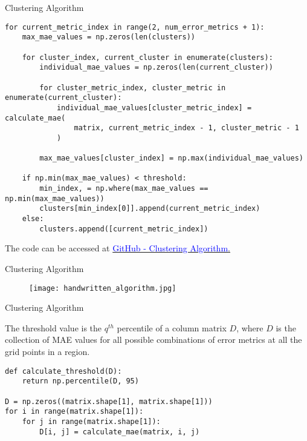\documentclass[xcolor={dvipsnames}]{beamer}
\begin{document}
\begin{frame}[fragile]{Clustering Algorithm}

{\scriptsize %
\begin{verbatim}
for current_metric_index in range(2, num_error_metrics + 1):
    max_mae_values = np.zeros(len(clusters))

    for cluster_index, current_cluster in enumerate(clusters):
        individual_mae_values = np.zeros(len(current_cluster))

        for cluster_metric_index, cluster_metric in enumerate(current_cluster):
            individual_mae_values[cluster_metric_index] = calculate_mae(
                matrix, current_metric_index - 1, cluster_metric - 1
            )

        max_mae_values[cluster_index] = np.max(individual_mae_values)

    if np.min(max_mae_values) < threshold:
        min_index, = np.where(max_mae_values == np.min(max_mae_values))
        clusters[min_index[0]].append(current_metric_index)
    else:
        clusters.append([current_metric_index]) 
\end{verbatim}
}

The code can be accessed at \href{https://github.com/AlexFidalgo/BergenProject/blob/main/Bergen_Metrics/clustering_algorithm/clustering_algorithm.py}{\textcolor{blue}{GitHub - Clustering Algorithm}.}

\end{frame}

\begin{frame}{Clustering Algorithm}

\begin{figure}
    \centering
    \texttt{[image: handwritten\_algorithm.jpg]}
    \setlength{\abovecaptionskip}{0pt}
    \label{fig:handwritten_algorithm}
\end{figure}
    
\end{frame}
    
\begin{frame}[fragile]{Clustering Algorithm}

The threshold value is the $q^{th}$ percentile of a column matrix $D$, where $D$ is the collection of MAE values for all possible combinations of error metrics at all the grid points in a region.

{\scriptsize 
\begin{verbatim}
def calculate_threshold(D):
    return np.percentile(D, 95)
    
D = np.zeros((matrix.shape[1], matrix.shape[1]))
for i in range(matrix.shape[1]):
    for j in range(matrix.shape[1]):
        D[i, j] = calculate_mae(matrix, i, j)
\end{verbatim}
}
\end{frame}
\end{document}
